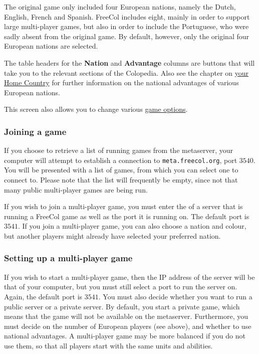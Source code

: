 \documentclass[12pt]{book}
\begin{document}
The original game only included four European nations, namely the
Dutch, English, French and Spanish. FreeCol includes eight, mainly in
order to support large multi-player games, but also in order to
include the Portuguese, who were sadly absent from the original
game. By default, however, only the original four European nations are
selected.

The table headers for the {\bf Nation} and {\bf Advantage} columns are
buttons that will take you to the relevant sections of the
Colopedia. Also see the chapter on \hyperlink{Home Country}{your Home
  Country} for further information on the national advantages of
various European nations.

This screen also allows you to change various \hyperlink{game options}
{game options}.


\hypertarget{Joining a game}{\subsubsection{Joining a game}}

If you choose to retrieve a list of running games from the metaserver,
your computer will attempt to establish a connection to
\verb$meta.freecol.org$, port $3540$. You will be
presented with a list of games, from which you can select one to
connect to. Please note that the list will frequently be empty, since
not that many public multi-player games are being run.

If you wish to join a multi-player game, you must enter the
 of a server that is running a FreeCol game as
well as the port it is running on. The default port is
$3541$. If you join a multi-player game, you can also
choose a nation and colour, but another players might already have
selected your preferred nation.


\hypertarget{Setting up a multi-player game}{\subsubsection{Setting up
    a multi-player game}}

If you wish to start a multi-player game, then the IP address of the
server will be that of your computer, but you must still select a port
to run the server on. Again, the default port is $3541$. You must also
decide whether you want to run a public server or a private server. By
default, you start a private game, which means that the game will not
be available on the metaserver. Furthermore, you must decide on the
number of European players (see above), and whether to use national
advantages. A multi-player game may be more balanced if you do not use
them, so that all players start with the same units and abilities.
\end{document}
